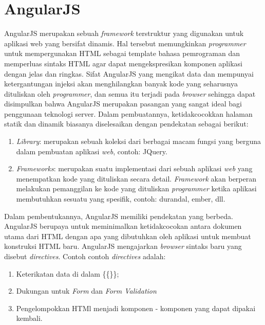 \section{AngularJS}
\label{sec: angularJS}
	
	AngularJS merupakan sebuah \textit{framework} terstruktur yang digunakan untuk aplikasi web yang bersifat dinamis. Hal tersebut memungkinkan \textit{programmer} untuk mempergunakan HTML sebagai template bahasa pemrograman dan memperluas sintaks HTML agar dapat mengekspresikan komponen aplikasi dengan jelas dan ringkas. Sifat AngularJS yang mengikat data dan mempunyai ketergantungan injeksi akan menghilangkan banyak kode yang seharusnya dituliskan oleh \textit{programmer}, dan semua itu terjadi pada \textit{browser} sehingga dapat disimpulkan bahwa AngularJS merupakan pasangan yang sangat ideal bagi penggunaan teknologi server. 
	Dalam pembuatannya, ketidakcocokkan halaman statik dan dinamik biasanya diselesaikan dengan pendekatan sebagai berikut:
	\begin{enumerate}
		\item \textit{Library}: merupakan sebuah koleksi dari berbagai macam fungsi yang berguna dalam pembuatan aplikasi \textit{web}, contoh: JQuery.
		\item \textit{Frameworks}: merupakan suatu implementasi dari sebuah aplikasi \textit{web} yang menempatkan kode yang dituliskan secara detail. \textit{Framework} akan berperan melakukan pemanggilan ke kode yang dituliskan \textit{programmer} ketika aplikasi membutuhkan sesuatu yang spesifik, contoh: durandal, ember, dll.
	\end{enumerate}
	
	Dalam pembentukannya, AngularJS memiliki pendekatan yang berbeda. AngularJS berupaya untuk meminimalkan ketidakcocokan antara dokumen utama dari HTML dengan apa yang dibutuhkan oleh aplikasi untuk membuat konstruksi HTML baru. AngularJS mengajarkan \textit{browser} sintaks baru yang disebut \textit{directives}. Contoh contoh \textit{directives} adalah:
	\begin{enumerate}
		\item Keterikatan data di dalam \{\{\}\};
		\item Dukungan untuk \textit{Form} dan \textit{Form Validation}
		\item Pengelompokkan HTMl menjadi komponen - komponen yang dapat dipakai kembali.
	\end{enumerate}
	
